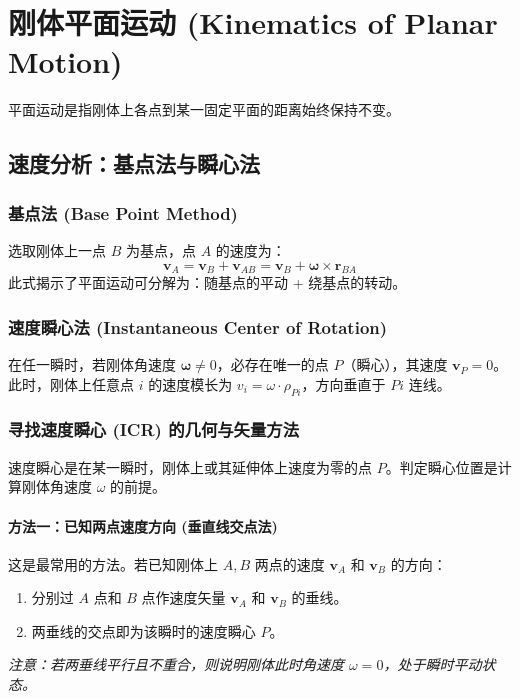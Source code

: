 \documentclass[12pt,a4paper]{article}
\newcommand{\vect}[1]{\mathbf{#1}}                   %
\begin{document}
\section{刚体平面运动 (Kinematics of Planar Motion)}

平面运动是指刚体上各点到某一固定平面的距离始终保持不变。

\subsection{速度分析：基点法与瞬心法}
\subsubsection{基点法 (Base Point Method)}
选取刚体上一点 $B$ 为基点，点 $A$ 的速度为：
\begin{equation}
    \vect{v}_A = \vect{v}_B + \vect{v}_{AB} = \vect{v}_B + \vect{\omega} \times \vect{r}_{BA}
\end{equation}
此式揭示了平面运动可分解为：随基点的平动 + 绕基点的转动。

\subsubsection{速度瞬心法 (Instantaneous Center of Rotation)}

在任一瞬时，若刚体角速度 $\vect{\omega} \neq 0$，必存在唯一的点 $P$（瞬心），其速度 $\vect{v}_P = 0$。
此时，刚体上任意点 $i$ 的速度模长为 $v_i = \omega \cdot \rho_{Pi}$，方向垂直于 $Pi$ 连线。
\subsubsection{寻找速度瞬心 (ICR) 的几何与矢量方法}

速度瞬心是在某一瞬时，刚体上或其延伸体上速度为零的点 $P$。判定瞬心位置是计算刚体角速度 $\omega$ 的前提。

\paragraph{方法一：已知两点速度方向 (垂直线交点法)}
这是最常用的方法。若已知刚体上 $A, B$ 两点的速度 $\vect{v}_A$ 和 $\vect{v}_B$ 的方向：
\begin{enumerate}
    \item 分别过 $A$ 点和 $B$ 点作速度矢量 $\vect{v}_A$ 和 $\vect{v}_B$ 的垂线。
    \item 两垂线的交点即为该瞬时的速度瞬心 $P$。
\end{enumerate}
\textit{注意：若两垂线平行且不重合，则说明刚体此时角速度 $\omega = 0$，处于瞬时平动状态。}
\end{document}
